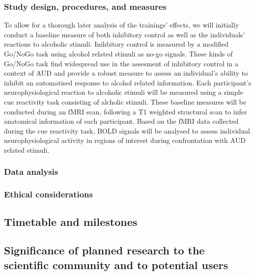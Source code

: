 \documentclass[12pt]{article}
\begin{document}
\lipsum[1-2]

\subsubsection{Study design, procedures, and measures}

To allow for a thorough later analysis of the trainings' effects, we will initially conduct a baseline measure of both inhibitory control as well as the individuals' reactions to alcoholic stimuli. Inihbitory control is measured by a modified Go/NoGo task using alcohol related stimuli as no-go signals. These kinds of Go/NoGo task find widespread use in the assesment of inhibitory control in a context of AUD and provide a robust measure to assess an individual's ability to inhibit an automatised response to alcohol related information. Each participant's neurophysiological reaction to alcoholic stimuli will be measured using a simple cue reactivity task consisting of alcholic stimuli. These baseline measures will be conducted during an fMRI scan, following a T1 weighted structural scan to infer anatomical information of each participant.
Based on the fMRI data collected during the cue reactivity task, BOLD signals will be analysed to assess individual neurophysiological activity in regions of interest during confrontation with AUD related stimuli.

\subsubsection{Data analysis}

\lipsum[1-3]

\subsubsection{Ethical considerations}

\lipsum[1-2]

\subsection{Timetable and milestones}

\lipsum[1-2]

\subsection{Significance of planned research to the scientific community and to potential users}

\lipsum[1-2]

\printbibliography  
\end{document}
